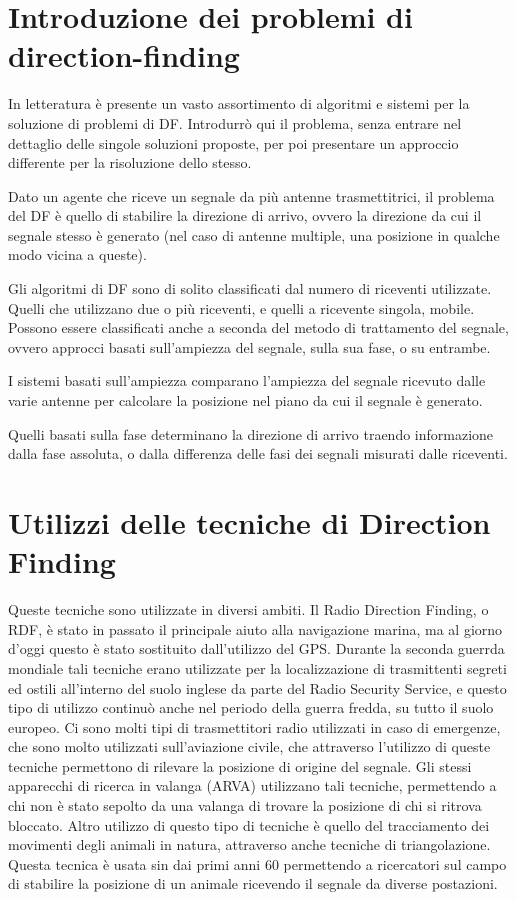 \section{Introduzione dei problemi di direction-finding}

In letteratura è presente un vasto assortimento di algoritmi e sistemi per la soluzione di problemi di DF. Introdurrò qui il problema,
senza entrare nel dettaglio delle singole soluzioni proposte, per poi presentare un approccio differente per la risoluzione dello stesso.

Dato un agente che riceve un segnale da più antenne trasmettitrici, il problema del DF è quello di stabilire la direzione di arrivo,
ovvero la direzione da cui il segnale stesso è generato (nel caso di antenne multiple, una posizione in qualche modo vicina a queste).

Gli algoritmi di DF sono di solito classificati dal numero di riceventi utilizzate. Quelli che utilizzano due o più riceventi, e quelli
a ricevente singola, mobile. Possono essere classificati anche a seconda del metodo di trattamento del segnale, ovvero approcci basati
sull'ampiezza del segnale, sulla sua fase, o su entrambe. 

I sistemi basati sull'ampiezza comparano l'ampiezza del segnale ricevuto dalle varie antenne per calcolare la posizione nel piano da cui
il segnale è generato.

Quelli basati sulla fase determinano la direzione di arrivo traendo informazione dalla fase assoluta, o dalla differenza delle fasi dei 
segnali misurati dalle riceventi.

\section{Utilizzi delle tecniche di Direction Finding}
Queste tecniche sono utilizzate in diversi ambiti. Il Radio Direction Finding, o RDF, è stato in passato il principale aiuto alla navigazione marina, ma al giorno d'oggi questo è stato sostituito dall'utilizzo del GPS.
Durante la seconda guerrda mondiale tali tecniche erano utilizzate per la localizzazione di trasmittenti segreti ed ostili all'interno del suolo inglese da parte del  Radio Security Service, e questo tipo di utilizzo continuò anche nel periodo della guerra fredda, su tutto il suolo europeo.
Ci sono molti tipi di trasmettitori radio utilizzati in caso di emergenze, che sono molto utilizzati sull'aviazione civile, che attraverso l'utilizzo di queste tecniche permettono di rilevare la posizione di origine del segnale.
Gli stessi apparecchi di ricerca in valanga (ARVA) utilizzano tali tecniche, permettendo a chi non è stato sepolto da una valanga di trovare la posizione di chi si ritrova bloccato.
Altro utilizzo di questo tipo di tecniche è quello del tracciamento dei movimenti degli animali in natura, attraverso anche tecniche di triangolazione. Questa tecnica è usata sin dai primi anni 60 permettendo a ricercatori sul campo di stabilire la posizione di un animale ricevendo il segnale da diverse postazioni.
